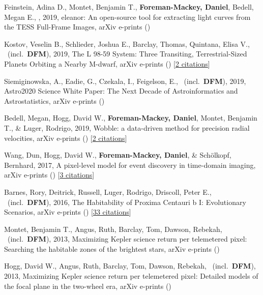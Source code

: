 \item[{\color{numcolor}\scriptsize8}] Feinstein, Adina D., Montet, Benjamin T., \textbf{Foreman-Mackey, Daniel}, Bedell, Megan E., \etal, 2019, eleanor: An open-source tool for extracting light curves from the TESS Full-Frame Images, arXiv e-prints ()

\item[{\color{numcolor}\scriptsize7}] Kostov, Veselin B., Schlieder, Joshua E., Barclay, Thomas, Quintana, Elisa V., \etal\ (incl.\ \textbf{DFM}), 2019, The L 98-59 System: Three Transiting, Terrestrial-Sized Planets Orbiting a Nearby M-dwarf, arXiv e-prints () [\href{http://adsabs.harvard.edu/abs/2019arXiv190308017K}{2 citations}]

\item[{\color{numcolor}\scriptsize6}] Siemiginowska, A., Eadie, G., Czekala, I., Feigelson, E., \etal\ (incl.\ \textbf{DFM}), 2019, Astro2020 Science White Paper: The Next Decade of Astroinformatics and Astrostatistics, arXiv e-prints ()

\item[{\color{numcolor}\scriptsize5}] Bedell, Megan, Hogg, David W., \textbf{Foreman-Mackey, Daniel}, Montet, Benjamin T., \& Luger, Rodrigo, 2019, Wobble: a data-driven method for precision radial velocities, arXiv e-prints () [\href{http://adsabs.harvard.edu/abs/2019arXiv190100503B}{2 citations}]

\item[{\color{numcolor}\scriptsize4}] Wang, Dun, Hogg, David W., \textbf{Foreman-Mackey, Daniel}, \& Sch{\"o}lkopf, Bernhard, 2017, A pixel-level model for event discovery in time-domain imaging, arXiv e-prints () [\href{http://adsabs.harvard.edu/abs/2017arXiv171002428W}{3 citations}]

\item[{\color{numcolor}\scriptsize3}] Barnes, Rory, Deitrick, Russell, Luger, Rodrigo, Driscoll, Peter E., \etal\ (incl.\ \textbf{DFM}), 2016, The Habitability of Proxima Centauri b I: Evolutionary Scenarios, arXiv e-prints () [\href{http://adsabs.harvard.edu/abs/2016arXiv160806919B}{33 citations}]

\item[{\color{numcolor}\scriptsize2}] Montet, Benjamin T., Angus, Ruth, Barclay, Tom, Dawson, Rebekah, \etal\ (incl.\ \textbf{DFM}), 2013, Maximizing Kepler science return per telemetered pixel: Searching the habitable zones of the brightest stars, arXiv e-prints ()

\item[{\color{numcolor}\scriptsize1}] Hogg, David W., Angus, Ruth, Barclay, Tom, Dawson, Rebekah, \etal\ (incl.\ \textbf{DFM}), 2013, Maximizing Kepler science return per telemetered pixel: Detailed models of the focal plane in the two-wheel era, arXiv e-prints ()